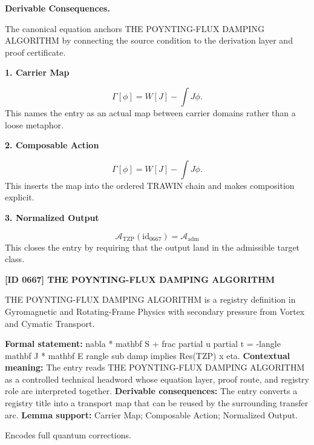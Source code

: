 \par\vspace{0.35em}
\noindent\textbf{Derivable Consequences.}\quad
\begingroup
\footnotesize
\raggedright
The canonical equation anchors THE POYNTING-FLUX DAMPING ALGORITHM by connecting the source condition to the derivation layer and proof certificate.
\par\endgroup

\noindent\textbf{1. Carrier Map}\par
\[
\Gamma[\phi] = W[J] - \int J\phi.
\]
\noindent This names the entry as an actual map between carrier domains rather than a loose metaphor.\par
\noindent\textbf{2. Composable Action}\par
\[
\boxed{ \Gamma[\phi] = W[J] - \int J\phi. }
\]
\noindent This inserts the map into the ordered TRAWIN chain and makes composition explicit.\par
\noindent\textbf{3. Normalized Output}\par
\[
\mathcal{A}_{\mathrm{TZP}}(\mathrm{id}_{0667})=\mathcal{A}_{\mathrm{adm}}
\]
\noindent This closes the entry by requiring that the output land in the admissible target class.\par

\clearpage
\noindent\textbf{[ID 0667] THE POYNTING-FLUX DAMPING ALGORITHM}\par
\vspace{0.35em}
\begingroup\small
{}
THE POYNTING-FLUX DAMPING ALGORITHM is a registry definition in Gyromagnetic and Rotating-Frame Physics with secondary pressure from Vortex and Cymatic Transport.

\begingroup\footnotesize\setlength{\emergencystretch}{3em}\sloppy
\textbf{Formal statement:} nabla * mathbf S + frac partial u partial t = -langle mathbf J * mathbf E rangle sub damp implies Res(TZP) x eta. \textbf{Contextual meaning:} The entry reads THE POYNTING-FLUX DAMPING ALGORITHM as a controlled technical headword whose equation layer, proof route, and registry role are interpreted together. \textbf{Derivable consequences:} The entry converts a registry title into a transport map that can be reused by the surrounding transfer arc. \textbf{Lemma support:} Carrier Map; Composable Action; Normalized Output.\par
\endgroup

Encodes full quantum corrections.

